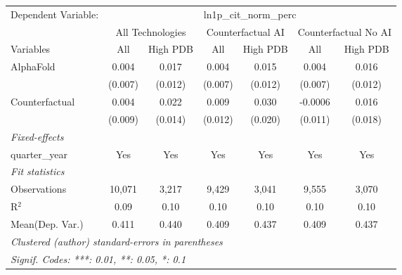 \begingroup
\centering
\begin{tabular}{lcccccc}
   \tabularnewline \midrule \midrule
   Dependent Variable: & \multicolumn{6}{c}{ln1p\_cit\_norm\_perc}\\
 & \multicolumn{2}{c}{All Technologies} & \multicolumn{2}{c}{Counterfactual AI} & \multicolumn{2}{c}{Counterfactual No AI} \\
\cmidrule(lr){1-1}\cmidrule(lr){2-3} \cmidrule(lr){4-5} \cmidrule(lr){6-7}
Variables & \multicolumn{1}{c}{All} & \multicolumn{1}{c}{High PDB} & \multicolumn{1}{c}{All} & \multicolumn{1}{c}{High PDB} & \multicolumn{1}{c}{All} & \multicolumn{1}{c}{High PDB} \\
\cmidrule(lr){1-1}\cmidrule(lr){2-2} \cmidrule(lr){3-3} \cmidrule(lr){4-4} \cmidrule(lr){5-5} \cmidrule(lr){6-6} \cmidrule(lr){7-7}
   AlphaFold      & 0.004   & 0.017   & 0.004   & 0.015   & 0.004   & 0.016\\   
                  & (0.007) & (0.012) & (0.007) & (0.012) & (0.007) & (0.012)\\   
   Counterfactual & 0.004   & 0.022   & 0.009   & 0.030   & -0.0006 & 0.016\\   
                  & (0.009) & (0.014) & (0.012) & (0.020) & (0.011) & (0.018)\\   
   \midrule
   \emph{Fixed-effects}\\
   quarter\_year  & Yes     & Yes     & Yes     & Yes     & Yes     & Yes\\  
   \midrule
   \emph{Fit statistics}\\
   Observations   & 10,071  & 3,217   & 9,429   & 3,041   & 9,555   & 3,070\\  
   R$^2$          & 0.09    & 0.10    & 0.10    & 0.10    & 0.10    & 0.10\\  
Mean(Dep. Var.) & 0.411 & 0.440 & 0.409 & 0.437 & 0.409 & 0.437 \\
   \midrule \midrule
   \multicolumn{7}{l}{\emph{Clustered (author) standard-errors in parentheses}}\\
   \multicolumn{7}{l}{\emph{Signif. Codes: ***: 0.01, **: 0.05, *: 0.1}}\\
\end{tabular}
\par\endgroup
